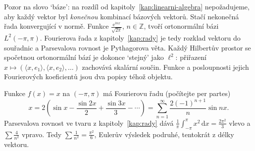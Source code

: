 Pozor na slovo `báze': na rozdíl od kapitoly~\ref{kap:linearni-algebra} nepožadujeme, aby každý vektor byl \textit{konečnou} kombinací bázových vektorů. Stačí nekonečná řada konvergující v normě. Funkce $\frac{\mathrm{e}^{inx}}{\sqrt{2\pi}}$, $n\in\mathbb{Z}$, tvoří ortonormální bázi $L^2(-\pi, \pi)$. Fourierova řada z kapitoly~\ref{kap:rady} je tedy rozklad vektoru do souřadnic a Parsevalova rovnost je Pythagorova věta. Každý Hilbertův prostor se spočetnou ortonormální bází je dokonce `stejný' jako $\ell^2$: přiřazení $x\mapsto(\langle x, e_1\rangle, \langle x, e_2\rangle, \dots)$ zachovává skalární součin. Funkce a posloupnosti jejich Fourierových koeficientů jsou dva popisy téhož objektu.

\begin{example}
  Funkce $f(x) = x$ na $(-\pi, \pi)$ má Fourierovu řadu (počítejte per partes)
  \begin{equation*}
    x = 2\left(\sin x - \frac{\sin 2x}{2} + \frac{\sin 3x}{3} - \cdots\right) = \sum_{n=1}^{\infty}\frac{2{(-1)}^{n+1}}{n}\sin nx.
  \end{equation*}
  Parsevalova rovnost ve tvaru z kapitoly~\ref{kap:rady} dává $\frac{1}{\pi}\int_{-\pi}^{\pi}x^2\,\mathrm{d}x = \frac{2\pi^2}{3}$ vlevo a $\sum\frac{4}{n^2}$ vpravo. Tedy $\sum\frac{1}{n^2} = \frac{\pi^2}{6}$, Eulerův výsledek podruhé, tentokrát z délky vektoru.
\end{example}

\begin{center}
\end{center}


